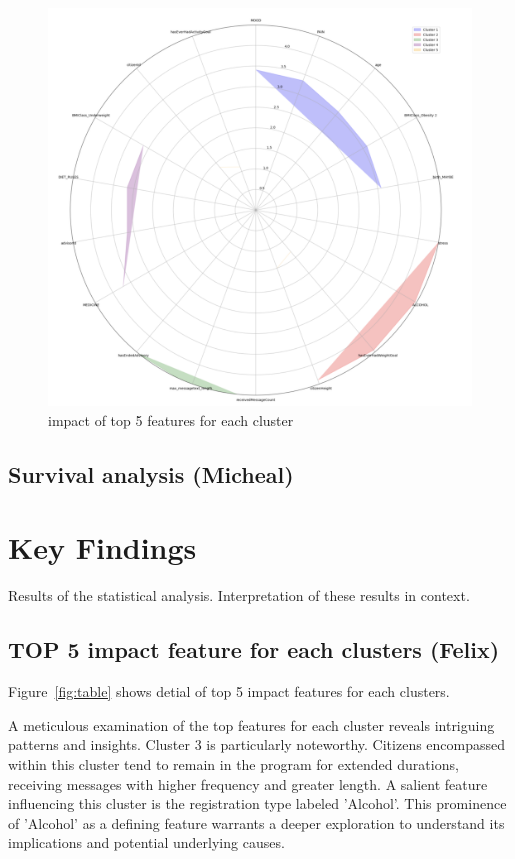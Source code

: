 \documentclass[12pt]{article}
\begin{document}
  \begin{figure}[h]
    \centering
    \includegraphics[width=0.7\linewidth]{images/top5_features.png}
    \caption{impact of top 5 features for each cluster}
    \label{fig:top5_features}
    \end{figure}

\subsection{Survival analysis (Micheal)}

\section{Key Findings}

Results of the statistical analysis.
Interpretation of these results in context.

\subsection{TOP 5 impact feature for each clusters (Felix)}

Figure~\ref{fig:table} shows detial of top 5 impact features for each clusters.

A meticulous examination of the top features for each cluster reveals intriguing patterns and insights. Cluster 3 is particularly noteworthy. Citizens encompassed within this cluster tend to remain in the program for extended durations, receiving messages with higher frequency and greater length. A salient feature influencing this cluster is the registration type labeled 'Alcohol'. This prominence of 'Alcohol' as a defining feature warrants a deeper exploration to understand its implications and potential underlying causes.
\end{document}
